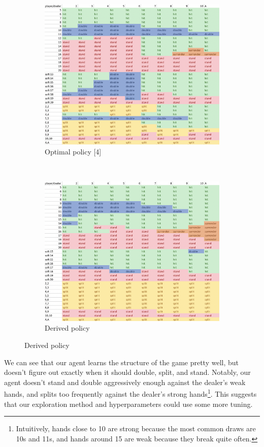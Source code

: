 \documentclass{article}
\begin{document}
\FloatBarrier
\begin{figure}[h]
	\centering
	\begin{subfigure}{0.45\textwidth}
		\includegraphics[width=\textwidth]{opt_chart}
		\caption{Optimal policy [4]}
	\end{subfigure}
	~
	\begin{subfigure}{0.45\textwidth}
		\includegraphics[width=\textwidth]{model_chart}
		\caption{Derived policy}
	\end{subfigure}
\end{figure}
\FloatBarrier

We can see that our agent learns the structure of the game pretty well, but doesn't figure out exactly when it should double, split, and stand. Notably, our agent doesn't stand and double aggressively enough against the dealer's weak hands, and splits too frequently against the dealer's strong hands\footnote{Intuitively, hands close to 10 are strong because the most common draws are 10s and 11s, and hands around 15 are weak because they break quite often.}. This suggests that our exploration method and hyperparameters could use some more tuning. 
\end{document}

